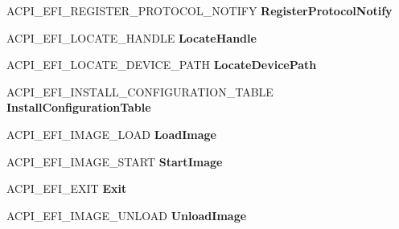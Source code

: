\begin{DoxyCompactItemize}
A\+C\+P\+I\+\_\+\+E\+F\+I\+\_\+\+R\+E\+G\+I\+S\+T\+E\+R\+\_\+\+P\+R\+O\+T\+O\+C\+O\+L\+\_\+\+N\+O\+T\+I\+FY {\bfseries Register\+Protocol\+Notify}
\item 
\mbox{\label{struct___a_c_p_i___e_f_i___b_o_o_t___s_e_r_v_i_c_e_s_a2bfccc4eba6b9c8d9d872edfd86589c8}} 
A\+C\+P\+I\+\_\+\+E\+F\+I\+\_\+\+L\+O\+C\+A\+T\+E\+\_\+\+H\+A\+N\+D\+LE {\bfseries Locate\+Handle}
\item 
\mbox{\label{struct___a_c_p_i___e_f_i___b_o_o_t___s_e_r_v_i_c_e_s_a7dbe1baf6860895948dbcd2223b14345}} 
A\+C\+P\+I\+\_\+\+E\+F\+I\+\_\+\+L\+O\+C\+A\+T\+E\+\_\+\+D\+E\+V\+I\+C\+E\+\_\+\+P\+A\+TH {\bfseries Locate\+Device\+Path}
\item 
\mbox{\label{struct___a_c_p_i___e_f_i___b_o_o_t___s_e_r_v_i_c_e_s_a34314d2ab41ced8394088700ff144495}} 
A\+C\+P\+I\+\_\+\+E\+F\+I\+\_\+\+I\+N\+S\+T\+A\+L\+L\+\_\+\+C\+O\+N\+F\+I\+G\+U\+R\+A\+T\+I\+O\+N\+\_\+\+T\+A\+B\+LE {\bfseries Install\+Configuration\+Table}
\item 
\mbox{\label{struct___a_c_p_i___e_f_i___b_o_o_t___s_e_r_v_i_c_e_s_a115ec9fce382549170caf7a8eb1a268f}} 
A\+C\+P\+I\+\_\+\+E\+F\+I\+\_\+\+I\+M\+A\+G\+E\+\_\+\+L\+O\+AD {\bfseries Load\+Image}
\item 
\mbox{\label{struct___a_c_p_i___e_f_i___b_o_o_t___s_e_r_v_i_c_e_s_a7aa44b10d6226808451501caf3f6ee93}} 
A\+C\+P\+I\+\_\+\+E\+F\+I\+\_\+\+I\+M\+A\+G\+E\+\_\+\+S\+T\+A\+RT {\bfseries Start\+Image}
\item 
\mbox{\label{struct___a_c_p_i___e_f_i___b_o_o_t___s_e_r_v_i_c_e_s_a7c9cd15aefc7a8905c620ae60f9d91fb}} 
A\+C\+P\+I\+\_\+\+E\+F\+I\+\_\+\+E\+X\+IT {\bfseries Exit}
\item 
\mbox{\label{struct___a_c_p_i___e_f_i___b_o_o_t___s_e_r_v_i_c_e_s_a14262b330b6e0090ef6a31db78e014cb}} 
A\+C\+P\+I\+\_\+\+E\+F\+I\+\_\+\+I\+M\+A\+G\+E\+\_\+\+U\+N\+L\+O\+AD {\bfseries Unload\+Image}

\end{DoxyCompactItemize}
